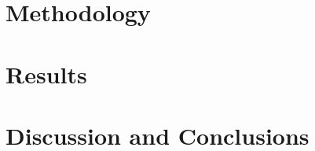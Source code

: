 \documentclass[11pt]{article}
\begin{document}
\section{Methodology}

\lipsum[7-9] %
\citep{Chavas2015} %

\section{Results}

\lipsum[12-13] %

\section{Discussion and Conclusions}

\lipsum[14] %

\medskip



\newpage

\end{document}
